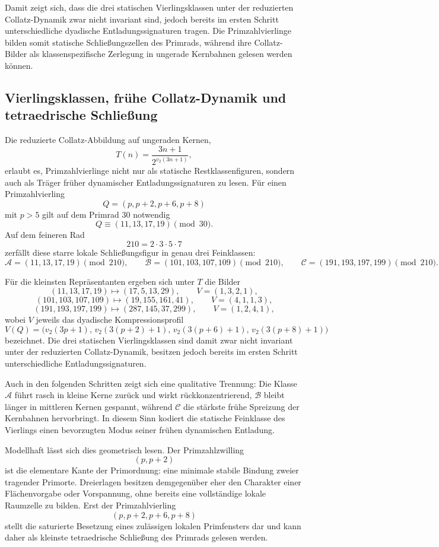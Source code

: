 \documentclass[11pt,a4paper]{article}
\theoremstyle{definition}
\begin{document}
Damit zeigt sich, dass die drei statischen Vierlingsklassen unter der
reduzierten Collatz-Dynamik zwar nicht invariant sind, jedoch bereits im
ersten Schritt unterschiedliche dyadische Entladungssignaturen tragen.
Die Primzahlvierlinge bilden somit statische Schlie\ss ungszellen des
Primrads, w\"ahrend ihre Collatz-Bilder als klassenspezifische Zerlegung
in ungerade Kernbahnen gelesen werden k\"onnen.

\subsection{Vierlingsklassen, fr\"uhe Collatz-Dynamik und tetraedrische Schlie\ss ung}

Die reduzierte Collatz-Abbildung auf ungeraden Kernen,
\[
T(n)=\frac{3n+1}{2^{v_2(3n+1)}},
\]
erlaubt es, Primzahlvierlinge nicht nur als statische Restklassenfiguren,
sondern auch als Tr\"ager fr\"uher dynamischer Entladungssignaturen zu lesen.
F\"ur einen Primzahlvierling
\[
Q=(p,p+2,p+6,p+8)
\]
mit $p>5$ gilt auf dem Primrad $30$ notwendig
\[
Q\equiv (11,13,17,19)\pmod{30}.
\]
Auf dem feineren Rad
\[
210=2\cdot 3\cdot 5\cdot 7
\]
zerf\"allt diese starre lokale Schlie\ss ungsfigur in genau drei Feinklassen:
\[
\mathcal A=(11,13,17,19)\pmod{210},
\qquad
\mathcal B=(101,103,107,109)\pmod{210},
\qquad
\mathcal C=(191,193,197,199)\pmod{210}.
\]

F\"ur die kleinsten Repr\"asentanten ergeben sich unter $T$ die Bilder
\[
(11,13,17,19)\mapsto (17,5,13,29),
\qquad
V=(1,3,2,1),
\]
\[
(101,103,107,109)\mapsto (19,155,161,41),
\qquad
V=(4,1,1,3),
\]
\[
(191,193,197,199)\mapsto (287,145,37,299),
\qquad
V=(1,2,4,1),
\]
wobei $V$ jeweils das dyadische Kompressionsprofil
\[
V(Q)=\bigl(v_2(3p+1),\,v_2(3(p+2)+1),\,v_2(3(p+6)+1),\,v_2(3(p+8)+1)\bigr)
\]
bezeichnet. Die drei statischen Vierlingsklassen sind damit zwar nicht
invariant unter der reduzierten Collatz-Dynamik, besitzen jedoch bereits
im ersten Schritt unterschiedliche Entladungssignaturen.

Auch in den folgenden Schritten zeigt sich eine qualitative Trennung:
Die Klasse $\mathcal A$ f\"uhrt rasch in kleine Kerne zur\"uck und wirkt
r\"uckkonzentrierend, $\mathcal B$ bleibt l\"anger in mittleren Kernen
gespannt, w\"ahrend $\mathcal C$ die st\"arkste fr\"uhe Spreizung der
Kernbahnen hervorbringt. In diesem Sinn kodiert die statische
Feinklasse des Vierlings einen bevorzugten Modus seiner fr\"uhen
dynamischen Entladung.

Modellhaft l\"asst sich dies geometrisch lesen. Der Primzahlzwilling
\[
(p,p+2)
\]
ist die elementare Kante der Primordnung: eine minimale stabile Bindung
zweier tragender Primorte. Dreierlagen besitzen demgegen\"uber eher den
Charakter einer Fl\"achenvorgabe oder Vorspannung, ohne bereits eine
vollst\"andige lokale Raumzelle zu bilden. Erst der Primzahlvierling
\[
(p,p+2,p+6,p+8)
\]
stellt die saturierte Besetzung eines zul\"assigen lokalen Primfensters
dar und kann daher als kleinste tetraedrische Schlie\ss ung des Primrads
gelesen werden.
\end{document}
